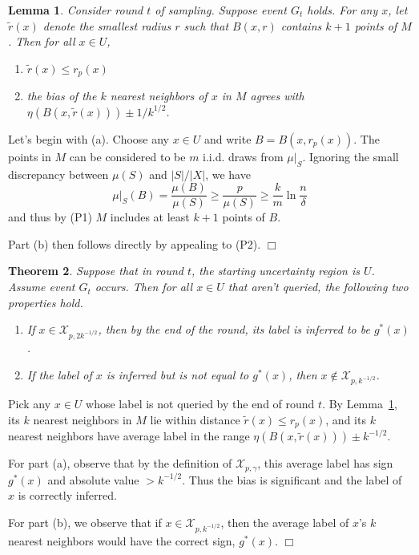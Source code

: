 \documentclass{article}
\def\X{{\mathcal X}}
\newtheorem{thm}{Theorem}
\newtheorem{lemma}[thm]{Lemma}
\newenvironment{proof}{\noindent {\sc Proof:}}{$\Box$ \medskip}
\begin{document}
\begin{lemma}
Consider round $t$ of sampling. Suppose event $G_t$ holds. For any $x$, let $\widetilde{r}(x)$ denote the smallest radius $r$ such that $B(x,r)$ contains $k+1$ points of $M$. Then for all $x \in U$,
\begin{enumerate}
\item[(a)] $\widetilde{r}(x) \leq r_p(x)$
\item[(b)] the bias of the $k$ nearest neighbors of $x$ in $M$ agrees with $\eta(B(x,\widetilde{r}(x))) \pm 1/k^{1/2}$.
\end{enumerate}
\label{lemma:bias-bound}
\end{lemma}
\begin{proof}
Let's begin with (a). Choose any $x \in U$ and write $B = B(x,r_p(x))$. The points in $M$ can be considered to be $m$ i.i.d. draws from $\mu|_S$. Ignoring the small discrepancy between $\mu(S)$ and $|S|/|X|$, we have 
$$ \mu|_S(B) = \frac{\mu(B)}{\mu(S)} \geq \frac{p}{\mu(S)} \geq \frac{k}{m} \ln \frac{n}{\delta}$$
and thus by (P1) $M$ includes at least $k+1$ points of $B$.

Part (b) then follows directly by appealing to (P2).
\end{proof}

\begin{thm}
Suppose that in round $t$, the starting uncertainty region is $U$. Assume event $G_t$ occurs. Then for all $x \in U$ that aren't queried, the following two properties hold.
\begin{enumerate}
\item[(a)] If $x \in \X_{p, 2k^{-1/2}}$, then by the end of the round, its label is inferred to be $g^*(x)$.
\item[(b)] If the label of $x$ is inferred but is not equal to $g^*(x)$, then $x \not\in \X_{p, k^{-1/2}}$.
\end{enumerate}
\end{thm}
\begin{proof}
Pick any $x \in U$ whose label is not queried by the end of round $t$. By Lemma~\ref{lemma:bias-bound}, its $k$ nearest neighbors in $M$ lie within distance $\widetilde{r}(x) \leq r_p(x)$, and its $k$ nearest neighbors have average label in the range $\eta(B(x, \widetilde{r}(x))) \pm k^{-1/2}$. 

For part (a), observe that by the definition of $\X_{p,\gamma}$, this average label has sign $g^*(x)$ and absolute value $> k^{-1/2}$. Thus the bias is significant and the label of $x$ is correctly inferred.

For part (b), we observe that if $x \in \X_{p, k^{-1/2}}$, then the average label of $x$'s $k$ nearest neighbors would have the correct sign, $g^*(x)$.
\end{proof}
\end{document}

